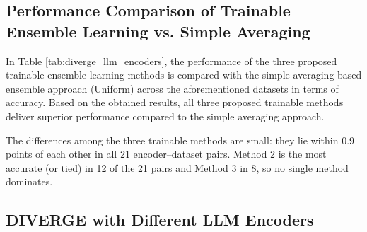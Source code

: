 \documentclass[a4paper,fleqn]{cas-sc}
\begin{document}
\subsection{Performance Comparison of Trainable Ensemble Learning vs. Simple Averaging}\label{sec:trainable_vs_avg}

In Table \ref{tab:diverge_llm_encoders}, the performance of the three proposed trainable ensemble learning methods is compared with the simple averaging-based ensemble approach (Uniform) across the aforementioned datasets in terms of accuracy. Based on the obtained results, all three proposed trainable methods deliver superior performance compared to the simple averaging approach.

The differences among the three trainable methods are small: they lie within 0.9 points of each other in all 21 encoder--dataset pairs. Method 2 is the most accurate (or tied) in 12 of the 21 pairs and Method 3 in 8, so no single method dominates.

\subsection{DIVERGE with Different LLM Encoders}\label{sec:llm_encoders}
\end{document}
